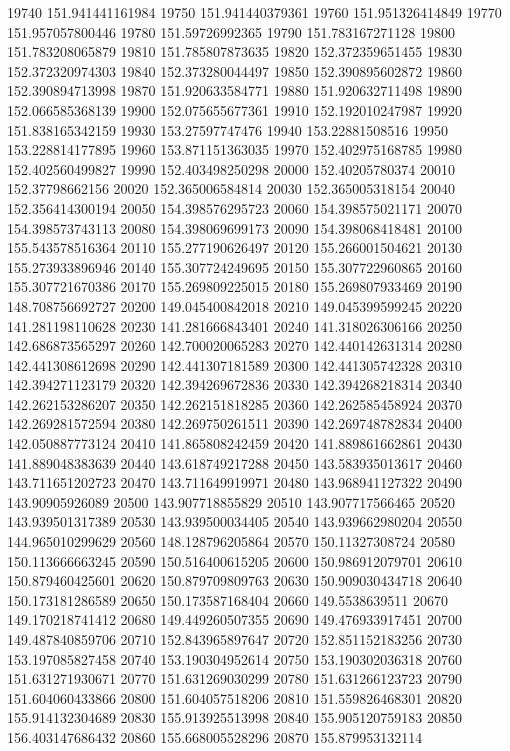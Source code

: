 {19740 151.941441161984
19750 151.941440379361
19760 151.951326414849
19770 151.957057800446
19780 151.59726992365
19790 151.783167271128
19800 151.783208065879
19810 151.785807873635
19820 152.372359651455
19830 152.372320974303
19840 152.373280044497
19850 152.390895602872
19860 152.390894713998
19870 151.920633584771
19880 151.920632711498
19890 152.066585368139
19900 152.075655677361
19910 152.192010247987
19920 151.838165342159
19930 153.27597747476
19940 153.22881508516
19950 153.228814177895
19960 153.871151363035
19970 152.402975168785
19980 152.402560499827
19990 152.403498250298
20000 152.40205780374
20010 152.37798662156
20020 152.365006584814
20030 152.365005318154
20040 152.356414300194
20050 154.398576295723
20060 154.398575021171
20070 154.398573743113
20080 154.398069699173
20090 154.398068418481
20100 155.543578516364
20110 155.277190626497
20120 155.266001504621
20130 155.273933896946
20140 155.307724249695
20150 155.307722960865
20160 155.307721670386
20170 155.269809225015
20180 155.269807933469
20190 148.708756692727
20200 149.045400842018
20210 149.045399599245
20220 141.281198110628
20230 141.281666843401
20240 141.318026306166
20250 142.686873565297
20260 142.700020065283
20270 142.440142631314
20280 142.441308612698
20290 142.441307181589
20300 142.441305742328
20310 142.394271123179
20320 142.394269672836
20330 142.394268218314
20340 142.262153286207
20350 142.262151818285
20360 142.262585458924
20370 142.269281572594
20380 142.269750261511
20390 142.269748782834
20400 142.050887773124
20410 141.865808242459
20420 141.889861662861
20430 141.889048383639
20440 143.618749217288
20450 143.583935013617
20460 143.711651202723
20470 143.711649919971
20480 143.968941127322
20490 143.90905926089
20500 143.907718855829
20510 143.907717566465
20520 143.939501317389
20530 143.939500034405
20540 143.939662980204
20550 144.965010299629
20560 148.128796205864
20570 150.11327308724
20580 150.113666663245
20590 150.516400615205
20600 150.986912079701
20610 150.879460425601
20620 150.879709809763
20630 150.909030434718
20640 150.173181286589
20650 150.173587168404
20660 149.5538639511
20670 149.170218741412
20680 149.449260507355
20690 149.476933917451
20700 149.487840859706
20710 152.843965897647
20720 152.851152183256
20730 153.197085827458
20740 153.190304952614
20750 153.190302036318
20760 151.631271930671
20770 151.631269030299
20780 151.631266123723
20790 151.604060433866
20800 151.604057518206
20810 151.559826468301
20820 155.914132304689
20830 155.913925513998
20840 155.905120759183
20850 156.403147686432
20860 155.668005528296
20870 155.879953132114
}
